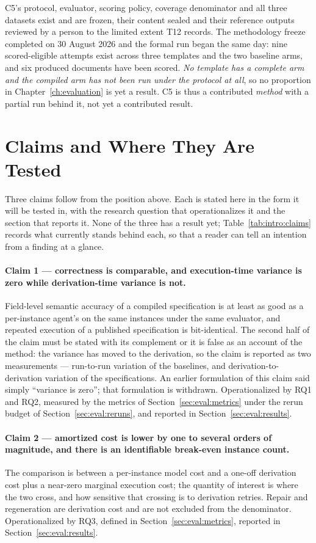 C5's protocol, evaluator, scoring policy, coverage denominator and all three datasets exist
and are frozen, their content sealed and their reference outputs reviewed by a person to the
limited extent T12 records. The methodology freeze completed on 30 August 2026 and the formal
run began the same day: nine scored-eligible attempts exist across three templates and the two
baseline arms, and six produced documents have been scored. \emph{No template has a complete
arm and the compiled arm has not been run under the protocol at all}, so no proportion in
Chapter~\ref{ch:evaluation} is yet a result. C5 is thus a contributed \emph{method} with a partial
run behind it, not yet a contributed result.

\section{Claims and Where They Are Tested}
\label{sec:intro:claims}

Three claims follow from the position above. Each is stated here in the form it will be tested
in, with the research question that operationalizes it and the section that reports it. None
of the three has a result yet; Table~\ref{tab:intro:claims} records what currently stands
behind each, so that a reader can tell an intention from a finding at a glance.

\paragraph{Claim 1 --- correctness is comparable, and execution-time variance is zero while
derivation-time variance is not.}
Field-level semantic accuracy of a compiled specification is at least as good as a
per-instance agent's on the same instances under the same evaluator, and repeated execution of
a published specification is bit-identical. The second half of the claim must be stated with
its complement or it is false as an account of the method: the variance has moved to the
derivation, so the claim is reported as two measurements --- run-to-run variation of the
baselines, and derivation-to-derivation variation of the specifications. An earlier
formulation of this claim said simply ``variance is zero''; that formulation is withdrawn.
Operationalized by RQ1 and RQ2, measured by the metrics of Section~\ref{sec:eval:metrics}
under the rerun budget of Section~\ref{sec:eval:reruns}, and reported in
Section~\ref{sec:eval:results}.

\paragraph{Claim 2 --- amortized cost is lower by one to several orders of magnitude, and
there is an identifiable break-even instance count.}
The comparison is between a per-instance model cost and a one-off derivation cost plus a
near-zero marginal execution cost; the quantity of interest is where the two cross, and how
sensitive that crossing is to derivation retries. Repair and regeneration are derivation cost
and are not excluded from the denominator. Operationalized by RQ3, defined in
Section~\ref{sec:eval:metrics}, reported in Section~\ref{sec:eval:results}.

